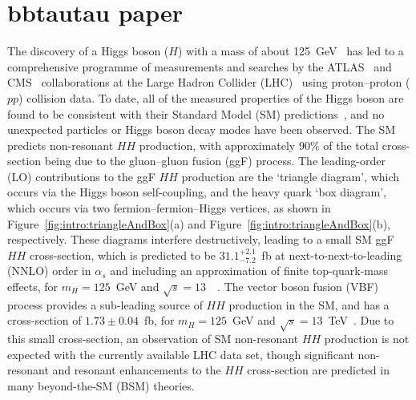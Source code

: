 \documentclass[twoside,11pt]{report}
\begin{document}
\section{bbtautau paper}

The discovery of a Higgs boson ($H$) with a mass of about 125~GeV~\cite{HIGG-2012-27,CMS-HIG-12-028} 
has led to a comprehensive programme of measurements and searches by the ATLAS~\cite{PERF-2007-01} 
and CMS~\cite{CMS-TDR-08-001} collaborations at the Large Hadron Collider (LHC)~\cite{Evans:2008zzb} 
using proton--proton ($pp$) collision data. To date, all of the measured properties of the Higgs boson are found 
to be consistent with their Standard Model (SM) 
predictions~\cite{HIGG-2014-14,CMS-HIG-19-004,HIGG-2013-17-witherratum,HIGG-2019-01,HIGG-2017-06,CMS-HIG-18-002,HIGG-2018-57,CMS-HIG-17-031}, 
and no unexpected particles or Higgs boson decay modes have been observed. The SM predicts 
non-resonant $HH$ production, with approximately 90\% of the total cross-section being due 
to the gluon--gluon fusion (ggF) process. The leading-order (LO) contributions to the ggF $HH$ production are 
the `triangle diagram', which occurs via the Higgs boson self-coupling, and the heavy quark `box diagram', 
which occurs via two fermion--fermion--Higgs vertices, as shown in Figure~\ref{fig:intro:triangleAndBox}(a) and 
Figure~\ref{fig:intro:triangleAndBox}(b), respectively. 
These diagrams interfere destructively, leading to a small SM ggF $HH$ cross-section, 
which is predicted to be $31.1^{+2.1}_{-7.2}$~fb at next-to-next-to-leading (NNLO) order 
in $\alpha_s$ and including an approximation of finite top-quark-mass effects, 
for $m_H=125$~GeV and 
$\sqrt{s}=13$~\TeV~\cite{Dawson:1998py,Borowka:2016ehy,Baglio:2018lrj,deFlorian:2013jea,Shao:2013bz,deFlorian:2015moa,Grazzini:2018bsd,Baglio:2020wgt}. The vector boson fusion (VBF) process provides a sub-leading source of $HH$ production in the SM, and has a cross-section of $1.73\pm 0.04$~fb, for $m_H=125$~GeV and $\sqrt{s}=13$~TeV~\cite{Baglio:2012np,Frederix:2014hta,Ling:2014sne,Dreyer:2018rfu,Dreyer:2018qbw}. Due to this small cross-section, an observation of SM non-resonant $HH$ production is not expected with the currently available LHC data set, though significant non-resonant and resonant enhancements to the $HH$ cross-section are predicted in many beyond-the-SM (BSM) theories.%
\end{document}
